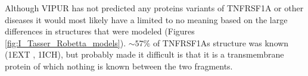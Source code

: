 %
%
 
Although VIPUR has not predicted any proteins variants of TNFRSF1A or other diseases it would most likely have a limited to no meaning based on the large differences in structures that were modeled (Figures \ref{fig:I_Tasser_Robetta_models}). $\sim57\%$ of TNFRSF1As structure was known (1EXT\cite{} , 1ICH\cite{}), but probably made it difficult is that it is a transmembrane protein of which nothing is known between the two fragments.

%
